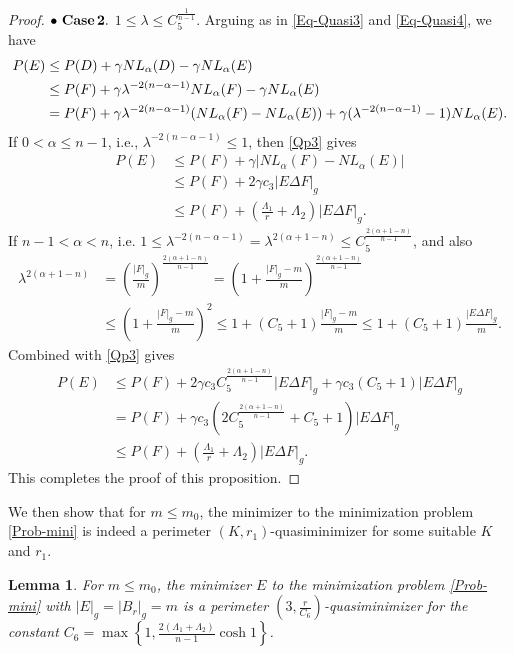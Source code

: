 \documentclass[11pt,reqno]{amsart}
\newtheorem{lem}[thm]{Lemma}
\theoremstyle{definition}
\theoremstyle{remark}
\numberwithin{equation}{section}
\renewcommand{\(}{\left(}
\renewcommand{\)}{\right)}
\renewcommand{\-}{\overline}
\begin{document}
\begin{proof}
$\bullet\,\,\bf{Case\,2.}$ $1\leq\lambda\leq C_5^{\frac{1}{n-1}}$. Arguing as in \eqref{Eq-Quasi3} and \eqref{Eq-Quasi4}, we have
\begin{align}
	P(E)&\leq P(D)+\gamma NL_{\alpha}(D)-\gamma NL_{\alpha}(E)\notag\\
	&\leq P(F)+\gamma{\lambda}^{-2(n-\alpha-1)}NL_{\alpha}(F)-\gamma NL_{\alpha}(E)\notag\\
	&= P(F)+\gamma{\lambda}^{-2(n-\alpha-1)}(NL_{\alpha}(F)-NL_{\alpha}(E))+\gamma({\lambda}^{-2(n-\alpha-1)}-1)NL_{\alpha}(E).\label{Qp3}
\end{align}
If $0<\alpha\leq n-1$, i.e., $\lambda^{-2(n-\alpha-1)}\leq 1$, then \eqref{Qp3} gives
\begin{align*}
	P(E)&\leq P(F)+\gamma|NL_{\alpha}(F)-NL_{\alpha}(E)|\\
	&\leq P(F)+2\gamma c_3|E\Delta F|_g\\
	&\leq P(F)+\left(\frac{\Lambda_1}{r}+\Lambda_2\right)|E\Delta F|_g.
\end{align*}
If $n-1<\alpha<n$, i.e. $1\leq\lambda^{-2(n-\alpha-1)}=\lambda^{2(\alpha+1-n)}\leq C_5^{\frac{2(\alpha+1-n)}{n-1}}$, and also
\begin{align*}
	\lambda^{2(\alpha+1-n)}&=\left(\frac{|F|_g}{m}\right)^{\frac{2(\alpha+1-n)}{n-1}}=\left(1+\frac{|F|_g-m}{m}\right)^{\frac{2(\alpha+1-n)}{n-1}}\\
	&\leq \left(1+\frac{|F|_g-m}{m}\right)^2\leq 1+(C_5+1)\frac{|F|_g-m}{m}\leq 1+(C_5+1)\frac{|E\Delta F|_g}{m}.
\end{align*}
Combined with \eqref{Qp3} gives
\begin{align*}
	P(E)&\leq P(F)+2\gamma c_3 C_5^{\frac{2(\alpha+1-n)}{n-1}}|E\Delta F|_g+\gamma c_3(C_5+1)|E\Delta F|_g\\
	&=P(F)+\gamma c_3\left(2C_5^{\frac{2(\alpha+1-n)}{n-1}}+C_5+1\right)|E\Delta F|_g\\
	&\leq P(F)+\left(\frac{\Lambda_1}{r}+\Lambda_2\right)|E\Delta F|_g.
\end{align*}
This completes the proof of this proposition.
\end{proof}
We then show that for $m\leq m_0$, the minimizer to the minimization problem \eqref{Prob-mini} is indeed a perimeter $(K,r_1)$-quasiminimizer for some suitable $K$ and $r_1$. 
\begin{lem}\label{Lem-Qua}
	For $m\leq m_0$, the minimizer $E$ to the minimization problem \eqref{Prob-mini} with $|E|_g=|B_r|_g=m$ is a perimeter $\left(3,\frac{r}{C_6}\right)$-quasiminimizer for the constant $C_6=\max\left\{1, \frac{2(\Lambda_1+\Lambda_2)}{n-1}\cosh 1\right\}$.
\end{lem}
\end{document}
